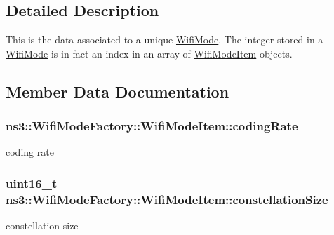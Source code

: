 \subsection{Detailed Description}
This is the data associated to a unique \hyperlink{classns3_1_1WifiMode}{Wifi\+Mode}. The integer stored in a \hyperlink{classns3_1_1WifiMode}{Wifi\+Mode} is in fact an index in an array of \hyperlink{structns3_1_1WifiModeFactory_1_1WifiModeItem}{Wifi\+Mode\+Item} objects. 

\subsection{Member Data Documentation}
\subsubsection[{\texorpdfstring{coding\+Rate}{codingRate}}]{ ns3\+::\+Wifi\+Mode\+Factory\+::\+Wifi\+Mode\+Item\+::coding\+Rate}\hypertarget{structns3_1_1WifiModeFactory_1_1WifiModeItem_a91cce9c5beef9c8a7fca90238cd93c53}{}\label{structns3_1_1WifiModeFactory_1_1WifiModeItem_a91cce9c5beef9c8a7fca90238cd93c53}


coding rate 

\subsubsection[{\texorpdfstring{constellation\+Size}{constellationSize}}]{\setlength{\rightskip}{0pt plus 5cm}uint16\+\_\+t ns3\+::\+Wifi\+Mode\+Factory\+::\+Wifi\+Mode\+Item\+::constellation\+Size}\hypertarget{structns3_1_1WifiModeFactory_1_1WifiModeItem_ab2eeabee2c139ad932dcac02afc2928d}{}\label{structns3_1_1WifiModeFactory_1_1WifiModeItem_ab2eeabee2c139ad932dcac02afc2928d}


constellation size 

